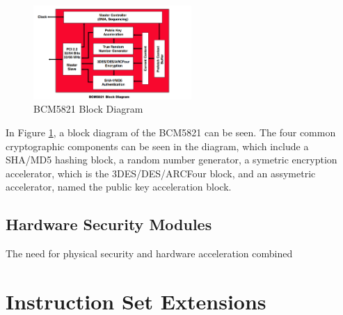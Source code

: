 \documentclass[journal]{IEEEtran}
\begin{document}
\begin{figure}[htbp]
	\centering
	\includegraphics[width=6cm,keepaspectratio]{img/broadcom.png}
	\caption{BCM5821 Block Diagram \cite{broadcom} }
	\label{broadcomFigure}
\end{figure}

In Figure \ref{broadcomFigure}, a block diagram of the BCM5821 can be seen.  The four common cryptographic components can be seen in the diagram, which include a SHA/MD5 hashing block, a random number generator, a symetric encryption accelerator, which is the 3DES/DES/ARCFour block, and an assymetric accelerator, named the public key acceleration block.

\subsection{Hardware Security Modules}

The need for physical security and hardware acceleration combined 

\section{Instruction Set Extensions}


%
%
\end{document}
